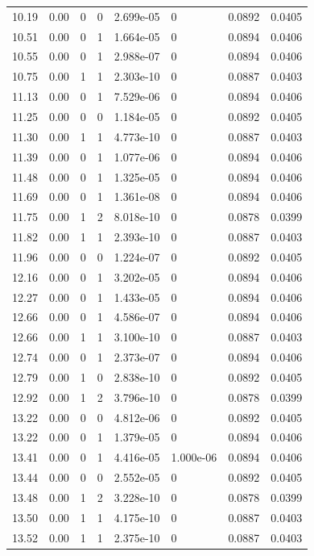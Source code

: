 \documentclass[preview]{standalone}
\begin{document}
{{{\begin{tabular}{L{1.2cm}C{1.2cm} C{0.3cm}C{0.5cm} C{1.4cm}C{1.4cm} C{1.4cm}C{1.4cm}}
  10.19  &  0.00  & 0     &  0 &  2.699e-05  & 0  & 0.0892 &  0.0405   \\ 
  10.51  &  0.00  & 0     &  1 &  1.664e-05  & 0  & 0.0894 &  0.0406   \\ 
  10.55  &  0.00  & 0     &  1 &  2.988e-07  & 0  & 0.0894 &  0.0406   \\ 
  10.75  &  0.00  & 1     &  1 &  2.303e-10  & 0  & 0.0887 &  0.0403   \\ 
  11.13  &  0.00  & 0     &  1 &  7.529e-06  & 0  & 0.0894 &  0.0406   \\ 
  11.25  &  0.00  & 0     &  0 &  1.184e-05  & 0  & 0.0892 &  0.0405   \\ 
  11.30  &  0.00  & 1     &  1 &  4.773e-10  & 0  & 0.0887 &  0.0403   \\ 
  11.39  &  0.00  & 0     &  1 &  1.077e-06  & 0  & 0.0894 &  0.0406   \\ 
  11.48  &  0.00  & 0     &  1 &  1.325e-05  & 0  & 0.0894 &  0.0406   \\ 
  11.69  &  0.00  & 0     &  1 &  1.361e-08  & 0  & 0.0894 &  0.0406   \\ 
  11.75  &  0.00  & 1     &  2 &  8.018e-10  & 0  & 0.0878 &  0.0399   \\ 
  11.82  &  0.00  & 1     &  1 &  2.393e-10  & 0  & 0.0887 &  0.0403   \\ 
  11.96  &  0.00  & 0     &  0 &  1.224e-07  & 0  & 0.0892 &  0.0405   \\ 
  12.16  &  0.00  & 0     &  1 &  3.202e-05  & 0  & 0.0894 &  0.0406   \\ 
  12.27  &  0.00  & 0     &  1 &  1.433e-05  & 0  & 0.0894 &  0.0406   \\ 
  12.66  &  0.00  & 0     &  1 &  4.586e-07  & 0  & 0.0894 &  0.0406   \\ 
  12.66  &  0.00  & 1     &  1 &  3.100e-10  & 0  & 0.0887 &  0.0403   \\ 
  12.74  &  0.00  & 0     &  1 &  2.373e-07  & 0  & 0.0894 &  0.0406   \\ 
  12.79  &  0.00  & 1     &  0 &  2.838e-10  & 0  & 0.0892 &  0.0405   \\ 
  12.92  &  0.00  & 1     &  2 &  3.796e-10  & 0  & 0.0878 &  0.0399   \\ 
  13.22  &  0.00  & 0     &  0 &  4.812e-06  & 0  & 0.0892 &  0.0405   \\ 
  13.22  &  0.00  & 0     &  1 &  1.379e-05  & 0  & 0.0894 &  0.0406   \\ 
  13.41  &  0.00  & 0     &  1 &  4.416e-05  & 1.000e-06  & 0.0894 &  0.0406   \\ 
  13.44  &  0.00  & 0     &  0 &  2.552e-05  & 0  & 0.0892 &  0.0405   \\ 
  13.48  &  0.00  & 1     &  2 &  3.228e-10  & 0  & 0.0878 &  0.0399   \\ 
  13.50  &  0.00  & 1     &  1 &  4.175e-10  & 0  & 0.0887 &  0.0403   \\ 
  13.52  &  0.00  & 1     &  1 &  2.375e-10  & 0  & 0.0887 &  0.0403   \\ 
\hline 
\end{tabular} 

}}}
\end{document}
